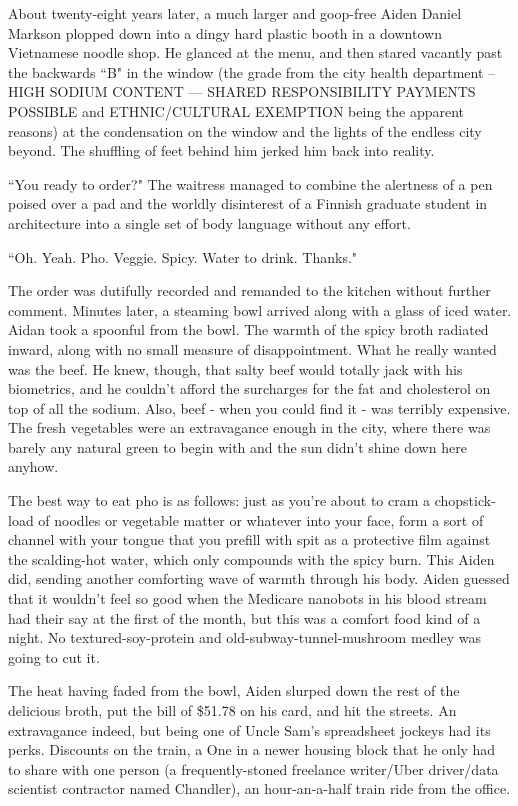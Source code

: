 \documentclass[11pt]{book}
\begin{document}
	About twenty-eight years later, a much larger and goop-free Aiden Daniel Markson plopped down into a dingy hard plastic booth in a downtown Vietnamese noodle shop. He glanced at the menu, and then stared vacantly past the backwards  ``B" in the window (the grade from the city health department -- HIGH SODIUM CONTENT --- SHARED RESPONSIBILITY PAYMENTS POSSIBLE and ETHNIC/CULTURAL EXEMPTION being the apparent reasons) at the condensation on the window and the lights of the endless city beyond. The shuffling of feet behind him jerked him back into reality.
	
	``You ready to order?" The waitress managed to combine the alertness of a pen poised over a pad and the worldly disinterest of a Finnish graduate student in architecture into a single set of body language without any effort.
	
	``Oh. Yeah. Pho. Veggie. Spicy. Water to drink. Thanks."
	
	The order was dutifully recorded and remanded to the kitchen without further comment. Minutes later, a steaming bowl arrived along with a glass of iced water. Aidan took a spoonful from the bowl. The warmth of the spicy broth radiated inward, along with no small measure of disappointment. What he really wanted was the beef. He knew, though, that salty beef would totally jack with his biometrics, and he couldn't afford the surcharges for the fat and cholesterol on top of all the sodium. Also, beef - when you could find it - was terribly expensive. The fresh vegetables were an extravagance enough in the city, where there was barely any natural green to begin with and the sun didn't shine down here anyhow. 
	
	The best way to eat pho is as follows: just as you're about to cram a chopstick-load of noodles or vegetable matter or whatever into your face, form a sort of channel with your tongue that you prefill with spit as a protective film against the scalding-hot water, which only compounds with the spicy burn. This Aiden did, sending another comforting wave of warmth through his body. Aiden guessed that it wouldn't feel so good when the Medicare nanobots in his blood stream had their say at the first of the month, but this was a comfort food kind of a night. No textured-soy-protein and old-subway-tunnel-mushroom medley was going to cut it.
	
	The heat having faded from the bowl, Aiden slurped down the rest of the delicious broth, put the bill of \$51.78 on his card, and hit the streets. An extravagance indeed, but being one of Uncle Sam's spreadsheet jockeys had its perks. Discounts on the train, a One in a newer housing block that he only had to share with one person (a frequently-stoned freelance writer/Uber driver/data scientist contractor named Chandler), an hour-an-a-half train ride from the office.
	
\end{document}
